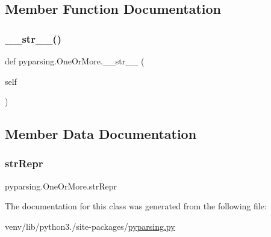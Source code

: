 \subsection{Member Function Documentation}
\mbox{\label{classpyparsing_1_1OneOrMore_a1204e3f0c12b4db20448c894c103c76b}} 
\subsubsection{\texorpdfstring{\+\_\+\+\_\+str\+\_\+\+\_\+()}{\_\_str\_\_()}}
{\footnotesize\ttfamily def pyparsing.\+One\+Or\+More.\+\_\+\+\_\+str\+\_\+\+\_\+ (\begin{DoxyParamCaption}\item[{}]{self }\end{DoxyParamCaption})}



\subsection{Member Data Documentation}
\mbox{\label{classpyparsing_1_1OneOrMore_a94798b104eabfe12f3f275146001264f}} 
\subsubsection{\texorpdfstring{str\+Repr}{strRepr}}
{\footnotesize\ttfamily pyparsing.\+One\+Or\+More.\+str\+Repr}



The documentation for this class was generated from the following file\+:\begin{DoxyCompactItemize}
\item 
venv/lib/python3./site-\/packages/\hyperlink{pyparsing_8py}{pyparsing.\+py}\end{DoxyCompactItemize}
